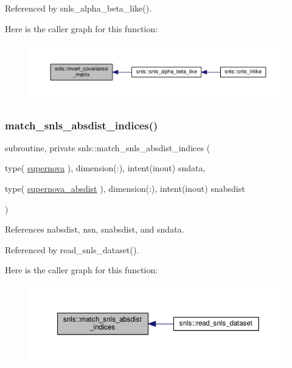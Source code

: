 Referenced by snls\+\_\+alpha\+\_\+beta\+\_\+like().

Here is the caller graph for this function\+:
\nopagebreak
\begin{figure}[H]
\begin{center}
\leavevmode
\includegraphics[width=350pt]{namespacesnls_a46f1f0ddbecf69ac1dbfa16bfd6af020_icgraph}
\end{center}
\end{figure}
\mbox{\label{namespacesnls_afabbfedccf34ae3b625359e7b29e67eb}} 
\subsubsection{\texorpdfstring{match\+\_\+snls\+\_\+absdist\+\_\+indices()}{match\_snls\_absdist\_indices()}}
{\footnotesize\ttfamily subroutine, private snls\+::match\+\_\+snls\+\_\+absdist\+\_\+indices (\begin{DoxyParamCaption}\item[{type( \mbox{\hyperlink{structsnls_1_1supernova}{supernova}} ), dimension(\+:), intent(inout)}]{sndata,  }\item[{type( \mbox{\hyperlink{structsnls_1_1supernova__absdist}{supernova\+\_\+absdist}} ), dimension(\+:), intent(inout)}]{snabsdist }\end{DoxyParamCaption})\hspace{0.3cm}{\ttfamily [private]}}



References nabsdist, nsn, snabsdist, and sndata.



Referenced by read\+\_\+snls\+\_\+dataset().

Here is the caller graph for this function\+:
\nopagebreak
\begin{figure}[H]
\begin{center}
\leavevmode
\includegraphics[width=350pt]{namespacesnls_afabbfedccf34ae3b625359e7b29e67eb_icgraph}
\end{center}
\end{figure}
\mbox{\label{namespacesnls_a7ebffb6abfd2942fbb0304d2ba6a234a}} 
